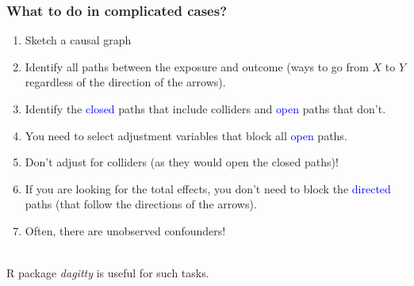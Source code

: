 \documentclass[10pt,dvipsnames,t,handout%
,aspectratio=169%
]{beamer}%
\newcommand{\sini}[1]{\textcolor{Blue}{#1}}
\begin{document}
\begin{frame}
\frametitle{What to do in complicated cases?}

\begin{enumerate}
\item Sketch a causal graph
\item Identify all paths between the exposure and outcome (ways to go from $X$ to $Y$ regardless of the direction of the arrows).
\item Identify the \sini{closed} paths that include colliders and \sini{open} paths that don't.  
\item You need to select adjustment variables that block all \sini{open} paths.
\item \alert{Don't} adjust for colliders (as they would open the closed paths)!
 \item If you are looking for the total effects, you don't need to block the \sini{directed} paths (that follow the directions of the arrows). 
\item \alert{Often, there are unobserved confounders!} 
\end{enumerate}
\mbox{}\\[0.5cm]
R package \textit{dagitty} is useful for such tasks.
\end{frame}
\end{document}
